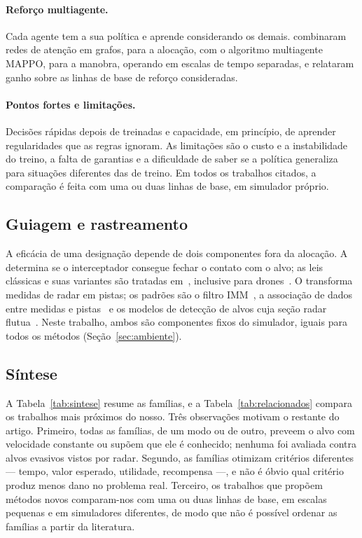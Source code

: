 \paragraph{Reforço multiagente.} Cada agente tem a sua política e aprende considerando os demais. \citet{jia2026} combinaram
redes de atenção em grafos, para a alocação, com o algoritmo multiagente MAPPO, para a manobra, operando em escalas de tempo
separadas, e relataram ganho sobre as linhas de base de reforço consideradas.

\paragraph{Pontos fortes e limitações.} Decisões rápidas depois de treinadas e capacidade, em princípio, de aprender
regularidades que as regras ignoram. As limitações são o custo e a instabilidade do treino, a falta de garantias e a
dificuldade de saber se a política generaliza para situações diferentes das de treino. Em todos os trabalhos citados, a
comparação é feita com uma ou duas linhas de base, em simulador próprio.

\subsection{Guiagem e rastreamento}
A eficácia de uma designação depende de dois componentes fora da alocação. A  determina se o
interceptador consegue fechar o contato com o alvo; as leis clássicas e suas variantes são tratadas
em~\cite{shneydor1998,zarchan2012,palumbo2010}, inclusive para drones~\cite{pliska2024}. O  transforma
medidas de radar em pistas; os padrões são o filtro IMM~\cite{blom1988}, a associação de dados entre medidas e
pistas~\cite{barshalom2001} e os modelos de detecção de alvos cuja seção radar flutua~\cite{swerling1960}. Neste trabalho,
ambos são componentes fixos do simulador, iguais para todos os métodos (Seção~\ref{sec:ambiente}).

\subsection{Síntese}
A Tabela~\ref{tab:sintese} resume as famílias, e a Tabela~\ref{tab:relacionados} compara os trabalhos mais próximos do
nosso. Três observações motivam o restante do artigo. Primeiro, todas as famílias, de um modo ou de outro, preveem o alvo
com velocidade constante ou supõem que ele é conhecido; nenhuma foi avaliada contra alvos evasivos vistos por radar.
Segundo, as famílias otimizam critérios diferentes --- tempo, valor esperado, utilidade, recompensa ---, e não é óbvio qual
critério produz menos dano no problema real. Terceiro, os trabalhos que propõem métodos novos comparam-nos com uma ou duas
linhas de base, em escalas pequenas e em simuladores diferentes, de modo que não é possível ordenar as famílias a partir da
literatura.

